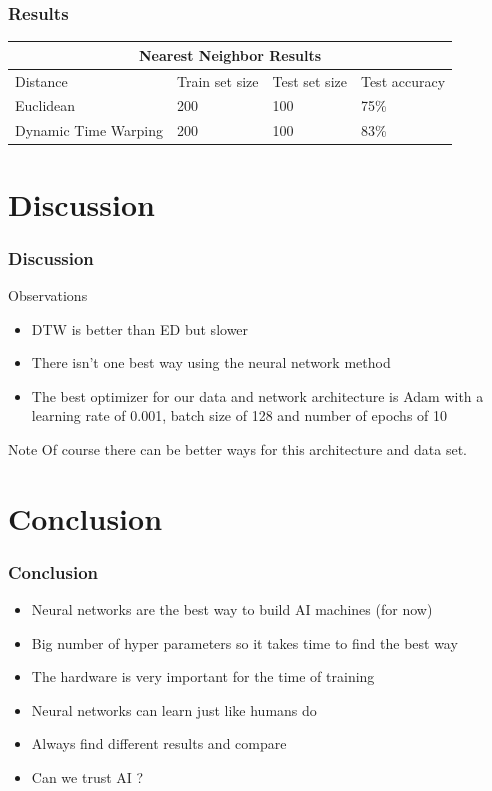 \documentclass{beamer}
\begin{document}
\begin{frame}
\frametitle{Results}
\begin{center}
\begin{tabular}{|p{4.3cm}||p{2cm}|p{2cm}|p{2cm}|}
\hline
\multicolumn{4}{|c|}{Nearest Neighbor Results}\\
\hline
Distance & Train set size & Test set size & Test accuracy\\
\hline
Euclidean & 200 & 100 & 75\%\\
\hline
Dynamic Time Warping & 200 & 100 & 83\%\\
\hline
\end{tabular}
\end{center}
\end{frame}

\section{Discussion}

\begin{frame}
\frametitle{Discussion}
\begin{block}{Observations}
\begin{itemize}
\item DTW is better than ED but slower
\item There isn't one best way using the neural network method
\item The best optimizer for our data and network architecture is Adam with a learning rate of 0.001, batch size of 128 and number of epochs of 10
\end{itemize}
\end{block}
\begin{alertblock}{Note}
Of course there can be better ways for this architecture and data set.
\end{alertblock}
\end{frame}

\section{Conclusion}
\begin{frame}
\frametitle{Conclusion}
\begin{itemize}
\item Neural networks are the best way to build AI machines (for now)
\item Big number of hyper parameters so it takes time to find the best way
\item The hardware is very important for the time of training
\item Neural networks can learn just like humans do
\item Always find different results and compare 
\item Can we trust AI ?
\end{itemize}
\end{frame}
\end{document}
